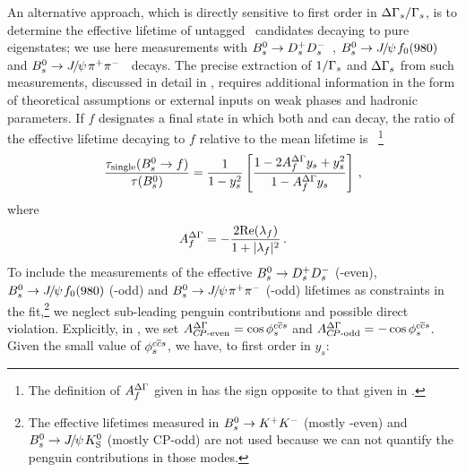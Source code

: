 An alternative approach, which is directly sensitive to first order in 
$\Delta\Gamma_{s}/\Gamma_{s}$, 
is to determine the effective lifetime of untagged \Bs\ candidates
decaying to %
pure \CP eigenstates; we use here measurements with
$B^0_s \to D_s^+D_s^-$~\cite{Aaij:2013bvd}, 
$B^0_s \to {J\mskip -3mu/\mskip -2mu\psi\mskip 2mu} f_0(980)$~\cite{Aaltonen:2011nk}
and $B^0_s\to {J\mskip -3mu/\mskip -2mu\psi\mskip 2mu} \pi^+\pi^-$~\cite{Aaij:2013oba,*LHCb:2011aa_mod,*LHCb:2012ad_mod,*LHCb:2011ab_mod,*Aaij:2012nta_mod} decays.
The precise extraction of $1/\Gamma_{s}$ and $\Delta\Gamma_{s}$
from such measurements, discussed in detail in , 
requires additional information 
in the form of theoretical assumptions or
external inputs on weak phases and hadronic parameters. 
If $f$ designates a final state in which both \Bs and \Bsbar can decay,
the ratio of the effective \Bs lifetime decaying to $f$ relative to the mean
\Bs lifetime is~\cite{Fleischer:2011cw}%
\footnote{The definition of $A_f^{\Delta\Gamma}$ given in  has the sign opposite to that given in .}
\begin{equation}
  \frac{\tau_{\rm single}(\Bs \to f)}{\tau(\Bs)} = \frac{1}{1-y_s^2} \left[ \frac{1 - 2A_f^{\DG} y_s + y_s^2}{1 - A_f^{\DG} y_s}\right ] \,,
\labe{tauf_fleisch}
\end{equation}
where
\begin{equation}
A_f^{\DG} = -\frac{2 \Re(\lambda_f)} {1+|\lambda_f|^2} \,.
\labe{ADG}
\end{equation}
To include the measurements of the effective
$B^0_s \to D_s^+D_s^-$ (\CP-even), $B^0_s \to {J\mskip -3mu/\mskip -2mu\psi\mskip 2mu} f_0(980)$ (\CP-odd) and
$B^0_s \to {J\mskip -3mu/\mskip -2mu\psi\mskip 2mu}\pi^+\pi^-$ (\CP-odd) 
lifetimes as constraints in the \DGs fit,\footnote{%
The effective lifetimes measured in $B^0_s\to K^+ K^-$ (mostly \CP-even) and  $B^0_s \to {J\mskip -3mu/\mskip -2mu\psi\mskip 2mu} K_{\rm S}^0$ (mostly CP-odd) are not used because we can not quantify the penguin contributions in those modes.}
we neglect sub-leading penguin contributions and possible direct \CP violation. 
Explicitly, in , we set
$A_{\mbox{\scriptsize \CP-even}}^{\DG} = \cos \phiccbars$
and $A_{\mbox{\scriptsize \CP-odd}}^{\DG} = -\cos \phiccbars$.
Given the small value of $\phiccbars$, we have, to first order in $y_s$:
